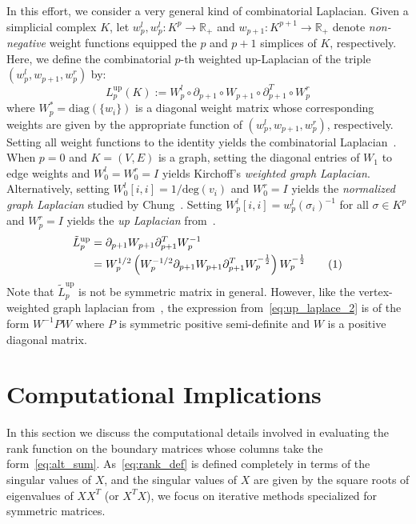 \documentclass[10pt]{article}
\numberwithin{equation}{section}
\newcommand{\+}{%
	\raisebox{0.18ex}{\scaleobj{0.55}{+}}
}
\theoremstyle{definition}
\newcommand\numberthis{\addtocounter{equation}{1}\tag{\theequation}}
\begin{document}
In this effort, we consider a very general kind of combinatorial Laplacian. Given a simplicial complex $K$, let $w_{p}^l, w_{p}^l: K^p \to \mathbb{R}_{+}$ and $w_{p+1}: K^{p+1} \to \mathbb{R}_{+}$ denote \emph{non-negative} weight functions equipped the $p$ and $p+1$ simplices of $K$, respectively.  
Here, we define the combinatorial $p$-th weighted up-Laplacian of the triple $(w_{p}^l, w_{p+1}, w_{p}^r)$ by: 
\begin{equation}\label{eq:weighted_up_laplace}
	L_p^{\mathrm{up}}(K) := W_p^l \circ \partial_{p+1} \circ W_{p+1} \circ \partial_{p+1}^T \circ W_p^r
\end{equation} 
where $W_p^\ast = \mathrm{diag}(\{ w_i \})$ is a diagonal weight matrix whose corresponding weights are given by the appropriate function of $(w_{p}^l, w_{p+1}, w_{p}^r)$, respectively. 
Setting all weight functions to the identity yields the combinatorial Laplacian~\cite{}. 
When $p = 0$ and $K = (V,E)$ is a graph, setting the diagonal entries of $W_1$ to edge weights and $W_0^l = W_0^r = I$ yields Kirchoff's \emph{weighted graph Laplacian}. 
Alternatively, setting $W_0^l[i,i] = 1/\mathrm{deg}(v_i)$ and $W_0^r = I$ yields the \emph{normalized graph Laplacian} studied by Chung~\cite{}.
Setting $W_p^l[i,i] = w_{p}^l(\sigma_i)^{-1}$ for all $\sigma \in K^p$ and $W_p^r = I$ yields the \emph{up Laplacian} from~\cite{}.
\begin{align*}\label{eq:up_laplace_2}
	\tilde{L}_p^{\mathrm{up}} &= \partial_{p+1} W_{p+1} \partial_{p+1}^T W_p^{-1}  \\
	&= W_p^{1/2} \left ( W_p^{-1/2}  \partial_{p+1} W_{p+1} \partial_{p+1}^T   W_p^{-\frac{1}{2}} \right ) W_p^{-\frac{1}{2}} \numberthis
\end{align*}
Note that $\tilde{L}_p^{\mathrm{up}}$ is not be symmetric matrix in general. However, like the vertex-weighted graph laplacian from~\cite{}, the expression from~\eqref{eq:up_laplace_2} is of the form $W^{-1} P W$ where $P$ is symmetric positive semi-definite and $W$ is a positive diagonal matrix. 

\section{Computational Implications}\label{sec:methodology}
In this section we discuss the computational details involved in evaluating the rank function on the boundary matrices whose columns take the form~\eqref{eq:alt_sum}. 
As~\eqref{eq:rank_def} is defined completely in terms of the singular values of $X$, and the singular values of $X$ are given by the square roots of eigenvalues of $X X^T$ (or $X^T X$), we focus on iterative methods specialized for symmetric matrices. 
\end{document}
